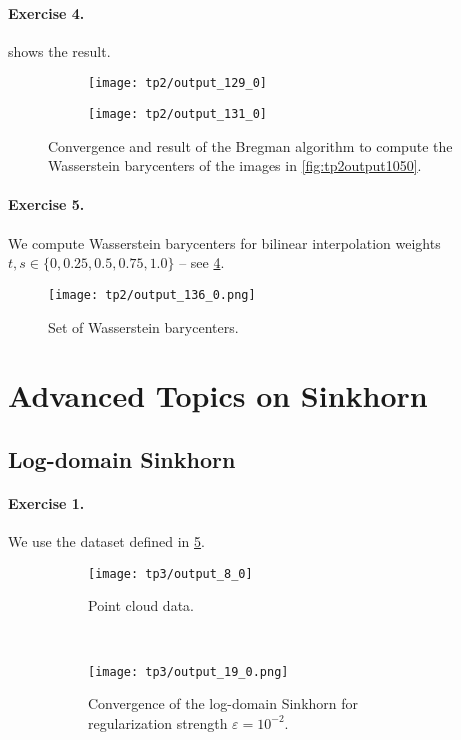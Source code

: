 \documentclass{article}
\renewcommand{\epsilon}{\varepsilon}
\numberwithin{equation}{section}
\theoremstyle{definition}
\begin{document}
\paragraph{Exercise 4.}  shows the result.
\begin{figure}[!h]
	\centering
	\begin{subfigure}{.49\linewidth}
		\centering
		\texttt{[image: tp2/output\_129\_0]}
		\caption{}
		\label{fig:output1290}
	\end{subfigure}
	\begin{subfigure}{.49\linewidth}
		\centering
		\texttt{[image: tp2/output\_131\_0]}
		\caption{}
		\label{fig:output1310}
	\end{subfigure}
	\caption{Convergence and result of the Bregman algorithm to compute the Wasserstein barycenters of the images in \cref{fig:tp2output1050}.}\label{fig:BregmanAlgo}
\end{figure}

\paragraph{Exercise 5.} We compute Wasserstein barycenters for bilinear interpolation weights $t,s\in \{0, 0.25, 0.5, 0.75, 1.0\}$ -- see \cref{fig:BarycenterMosaic}.
\begin{figure}[!h]
	\centering
	\texttt{[image: tp2/output\_136\_0.png]}\caption{Set of Wasserstein barycenters.}
	\label{fig:BarycenterMosaic}
\end{figure}


\clearpage

\section{Advanced Topics on Sinkhorn}

\subsection{Log-domain Sinkhorn}

\paragraph{Exercise 1.} We use the dataset defined in \cref{fig:tp3output80}.
\begin{figure}[!h]
	\centering
	\begin{subfigure}[t]{.49\linewidth}
		\centering
		\texttt{[image: tp3/output\_8\_0]}
		\caption{Point cloud data.}\label{fig:tp3output80}
	\end{subfigure}~
	\begin{subfigure}[t]{.49\linewidth}
		\centering
		\texttt{[image: tp3/output\_19\_0.png]}
		\caption{Convergence of the log-domain Sinkhorn for regularization strength $\epsilon = 10^{-2}$.}
		\label{fig:tp3output190}
	\end{subfigure}
	\caption{}
\end{figure}
\end{document}
